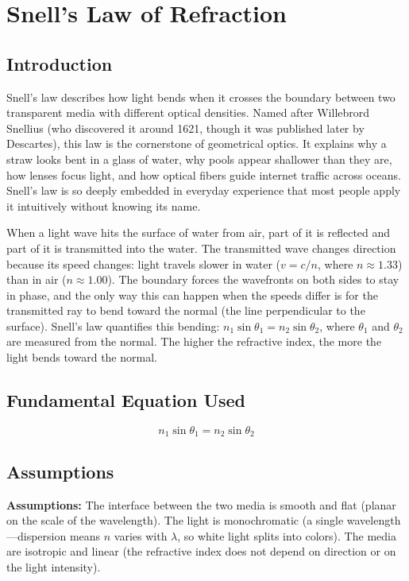 \chapter{Snell's Law of Refraction}

\section*{Introduction}

Snell's law describes how light bends when it crosses the boundary between two transparent media with different optical densities. Named after Willebrord Snellius (who discovered it around 1621, though it was published later by Descartes), this law is the cornerstone of geometrical optics. It explains why a straw looks bent in a glass of water, why pools appear shallower than they are, how lenses focus light, and how optical fibers guide internet traffic across oceans. Snell's law is so deeply embedded in everyday experience that most people apply it intuitively without knowing its name.

When a light wave hits the surface of water from air, part of it is reflected and part of it is transmitted into the water. The transmitted wave changes direction because its speed changes: light travels slower in water ($v = c/n$, where $n \approx 1.33$) than in air ($n \approx 1.00$). The boundary forces the wavefronts on both sides to stay in phase, and the only way this can happen when the speeds differ is for the transmitted ray to bend toward the normal (the line perpendicular to the surface). Snell's law quantifies this bending: $n_1\sin\theta_1 = n_2\sin\theta_2$, where $\theta_1$ and $\theta_2$ are measured from the normal. The higher the refractive index, the more the light bends toward the normal.
\section*{Fundamental Equation Used}

\begin{equation}
n_1\sin\theta_1 = n_2\sin\theta_2
\end{equation}
\section*{Assumptions}

\textbf{Assumptions:} The interface between the two media is smooth and flat (planar on the scale of the wavelength). The light is monochromatic (a single wavelength---dispersion means $n$ varies with $\lambda$, so white light splits into colors). The media are isotropic and linear (the refractive index does not depend on direction or on the light intensity).



